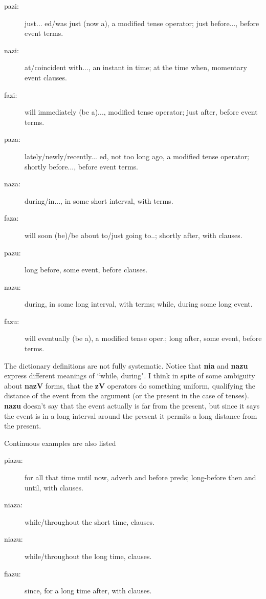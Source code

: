 \documentclass[12pt]{book}
\begin{document}
\begin{description}

\item[pazi:]  just... ed/was just (now a), a modified tense operator;  just before..., before event terms.

\item[nazi:]  at/coincident with..., an instant in time;  at the time when, momentary event clauses.

\item[fazi:]  will immediately (be a)..., modified tense operator;  just after, before event terms.

\item[paza:]  lately/newly/recently... ed, not too long ago, a modified tense operator; shortly before..., before event terms.

\item[naza:]  during/in..., in some short interval, with terms.

\item[faza:]   will soon (be)/be about to/just going to..;  shortly after, with clauses.

\item[pazu:]  long before, some event, before clauses.

\item[nazu:]  during, in some long interval, with terms; while, during some long event.

\item[fazu:]  will eventually (be a), a modified tense oper.;  long after, some event, before terms.


\end{description}


The dictionary definitions are not fully systematic.   Notice that {\bf nia} and {\bf nazu} express different meanings of ``while, during".    I think in spite of some ambiguity about
{\bf nazV} forms, that the {\bf zV} operators do something uniform, qualifying the distance of the event from the argument (or the present in the case of tenses).   {\bf nazu}
doesn't say that the event actually is far from the present, but since it says the event is in a long interval around the present it permits a long distance from the present.

Continuous examples are also listed


\begin{description}

\item[piazu:]  for all that time until now, adverb and before preds; long-before then and until, with clauses.

\item[niaza:]  while/throughout the short time, clauses.

\item[niazu:]  while/throughout the long time, clauses.

\item[fiazu:]  since, for a long time after, with clauses.


\end{description}
\end{document}
